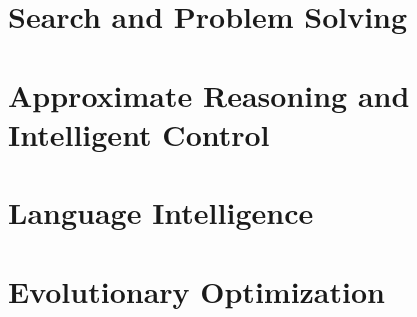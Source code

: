 \documentclass[11pt,oneside,a4paper]{report}
\begin{document}


\cleardoublepage
{}

\part{Search and Problem Solving}





\part{Approximate Reasoning and Intelligent Control}



\part{Language Intelligence}



\part{Evolutionary Optimization}

\end{document}
